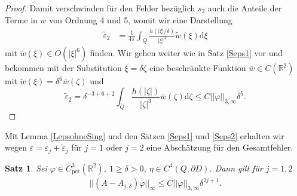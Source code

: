 \documentclass[12pt,a4paper]{scrartcl}
\newtheorem{Satz}{Satz}[section]
\newcommand{\dd}{\mathrm{d}}
\numberwithin{equation}{section}
\newcommand{\R}{\mathbb{R}} %
\newcommand{\per}{\operatorname{per}}
\begin{document}
\begin{proof}
Damit verschwinden für den Fehler bezüglich $s_2$ auch die Anteile der Terme in $w$ von Ordnung 4 und 5, womit wir eine Darstellung
\begin{align*}
\widetilde \varepsilon_2 &= \frac{1}{4 \pi} \int_{Q}  \frac{h(|\xi|/\delta)}{|\xi|^3} \tilde{w}(\xi)\dd \xi
\end{align*}  
mit $\tilde{w}(\xi) \in O(|\xi|^6)$ finden. Wir gehen weiter wie in Satz \ref{Seps1} vor und bekommen mit der Substitution $\xi = \delta \zeta$ eine beschränkte Funktion $\overline{w}\in C(\R^2)$ mit $\tilde w(\xi) = \delta^6 \overline{w}(\zeta)$ und
\[
\widetilde \varepsilon_2= \delta^{-3+6+2} \int_{\tilde{Q} } \frac{h(|\zeta|)}{|\zeta|^3}\overline{w}(\zeta) \dd \zeta \leq  C ||\varphi||_{3,\infty} \delta^5.
\]
\end{proof}
Mit Lemma \ref{LepsohneSing} und den Sätzen \ref{Seps1} und \ref{Seps2} erhalten wir wegen $\varepsilon=  \varepsilon_j + \widetilde \varepsilon_j$ für $j=1$ oder $j=2$ eine Abschätzung für den Gesamtfehler.
\begin{Satz}
Sei $\varphi \in C_{\per}^3(\R^2)$, $1\geq\delta >0$, $\eta\in C^4(Q,\partial D)$. Dann gilt für $j=1,2$
\begin{align*}
||(A-A_{j,\delta})\varphi||_\infty \leq C ||\varphi||_{3,\infty}\delta^{2j+1}.
\end{align*}

\end{Satz}  
\end{document}
